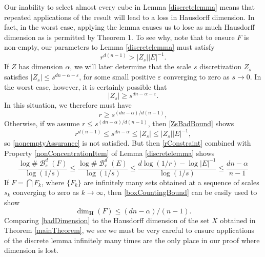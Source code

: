 \documentclass[dvipsnames,letterpaper,12pt]{article}
\numberwithin{equation}{section}
\theoremstyle{plain}
\DeclareMathOperator{\B}{\mathcal{B}}
\begin{document}
Our inability to select almost every cube in Lemma \ref{discretelemma} means that repeated applications of the result will lead to a loss in Hausdorff dimension. In fact, in the worst case, applying the lemma causes us to lose as much Hausdorff dimension as is permitted by Theorem 1. To see why, note that to ensure $F$ is non-empty, our parameters to Lemma \ref{discretelemma} must satisfy
%
\begin{equation}\label{nonemptyAssurance}
	r^{d(n-1)} > |Z_s| |E|^{-1}.
\end{equation}
%
If $Z$ has dimension $\alpha$, we will later determine that the scale $s$ discretization $Z_s$ satisfies $|Z_s| \leq s^{dn - \alpha - \varepsilon}$, for some small positive $\varepsilon$ converging to zero as $s \to 0$. In the worst case, however, it is certainly possible that
%
\begin{equation}\label{ZsBadBound}
	|Z_s| \geq s^{dn - \alpha - \varepsilon}.
\end{equation}
%
In this situation, we therefore must have
%
\begin{equation} \label{rConstraint}
	r \geq s^{(dn - \alpha)/d(n-1)},
\end{equation}
%
Otherwise, if we assume $r \leq s^{(dn - \alpha)/d(n-1)}$, then \eqref{ZsBadBound} shows
%
\begin{equation} \label{rContradiction}
	r^{d(n-1)} \leq s^{dn - \alpha} \leq |Z_s| \leq |Z_s| |E|^{-1},
\end{equation}
%
so \eqref{nonemptyAssurance} is not satisfied. But then \eqref{rConstraint} combined with Property \ref{nonConcentrationItem} of Lemma \ref{discretelemma} shows
%
\begin{equation} \label{boxCountingBound}
	\frac{\log \# \B^d_s(F)}{\log(1/s)} \leq \frac{\log \# \B^d_r(E)}{\log(1/s)} \leq \frac{d \log(1/r) - \log |E|^{-1}}{\log(1/s)} \leq \frac{dn - \alpha}{n - 1}
\end{equation}
%
If $F = \bigcap F_k$, where $\{ F_k \}$ are infinitely many sets obtained at a sequence of scales $s_k$ converging to zero as $k \to \infty$, then \eqref{boxCountingBound} can be easily used to show
%
\begin{equation} \label{badDimension}
	\dim_{\mathbf{H}}(F) \leq (dn - \alpha)/(n-1).
\end{equation}
%
Comparing \eqref{badDimension} to the Hausdorff dimension of the set $X$ obtained in Theorem \ref{mainTheorem}, we see we must be very careful to ensure applications of the discrete lemma infinitely many times are the only place in our proof where dimension is lost.
\end{document}
